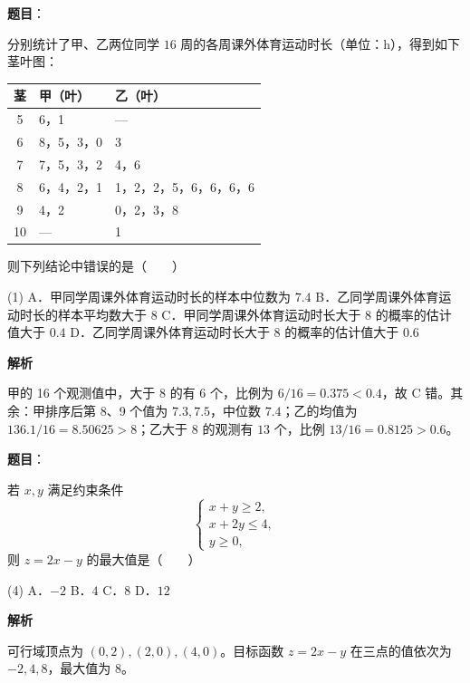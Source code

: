 \begin{answer}

\textbf{题目}：

分别统计了甲、乙两位同学 $16$ 周的各周课外体育运动时长（单位：h），得到如下茎叶图：

\begin{center}
\begin{tabular}{cll}
\toprule
茎 & 甲（叶） & 乙（叶） \\
\midrule
5 & 6，1 & — \\
6 & 8，5，3，0 & 3 \\
7 & 7，5，3，2 & 4，6 \\
8 & 6，4，2，1 & 1，2，2，5，6，6，6，6 \\
9 & 4，2 & 0，2，3，8 \\
10 & — & 1 \\
\bottomrule
\end{tabular}
\end{center}

则下列结论中错误的是\mbox{（　　）}

\begin{gkopts}(1)
\task A．甲同学周课外体育运动时长的样本中位数为 $7.4$
\task B．乙同学周课外体育运动时长的样本平均数大于 $8$
\task C．甲同学周课外体育运动时长大于 $8$ 的概率的估计值大于 $0.4$
\task D．乙同学周课外体育运动时长大于 $8$ 的概率的估计值大于 $0.6$
\end{gkopts}

\textbf{解析}

甲的 16 个观测值中，大于 $8$ 的有 $6$ 个，比例为 $6/16=0.375<0.4$，故 C 错。其余：甲排序后第 8、9 个值为 $7.3,7.5$，中位数 $7.4$；乙的均值为 $136.1/16=8.50625>8$；乙大于 $8$ 的观测有 $13$ 个，比例 $13/16=0.8125>0.6$。


\end{answer}
\begin{answer}

\textbf{题目}：

若 $x,y$ 满足约束条件
\nopagebreak[4]
\[
\begin{cases}
x+y\ge 2,\\
x+2y\le 4,\\
y\ge 0,
\end{cases}
\]
则 $z=2x-y$ 的最大值是\mbox{（　　）}

\begin{gkopts}(4)
\task A．$-2$
\task B．$4$
\task C．$8$
\task D．$12$
\end{gkopts}

\textbf{解析}

可行域顶点为 $(0,2),(2,0),(4,0)$。目标函数 $z=2x-y$ 在三点的值依次为 $-2,4,8$，最大值为 $8$。


\end{answer}
